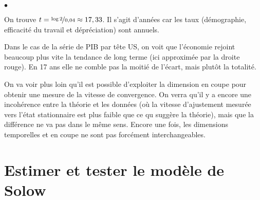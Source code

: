 \documentclass[10pt,notheorems]{beamer}
\theoremstyle{plain}
\theoremstyle{definition} %
\begin{document}
\begin{notes}
\begin{list}{$\bullet$}{}
  \item On trouve $t=\nicefrac{\log 2}{0,04} \approx 17,33$. Il s'agit d'années
    car les taux (démographie, efficacité du travail et dépréciation)
    sont annuels.\newline

  \item Dans le cas de la série de PIB par tête US, on voit que l'économie
    rejoint beaucoup plus vite la tendance de long terme (ici approximée par la
    droite rouge). En 17 ans elle ne comble pas la moitié de l'écart, mais
    plutôt la totalité.\newline

  \item On va voir plus loin qu'il est possible d'exploiter la dimension en
    coupe pour obtenir une mesure de la vitesse de convergence. On verra qu'il y
    a encore une incohérence entre la théorie et les données (où la vitesse
    d'ajustement mesurée vers l'état stationnaire est plus faible que ce qu
    suggère la théorie), mais que la différence ne va pas dans le même sens.
    Encore une fois, les dimensions temporelles et en coupe ne sont pas forcément
    interchangeables.

  \end{list}

\end{notes}

\section{Estimer et tester le modèle de Solow}
\end{document}
